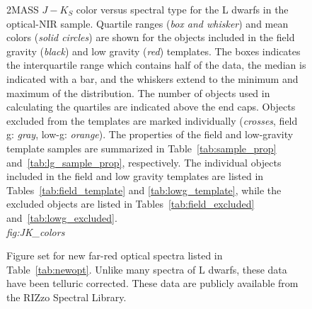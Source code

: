 \documentclass[12pt,preprint]{aastex}
\begin{document}
\begin{figure}
		\caption{2MASS $J-K_S$ color versus spectral type for the L dwarfs in the optical-NIR sample. 
		Quartile ranges (\emph{box and whisker}) and mean colors (\emph{solid circles}) are shown for the objects included in the field gravity (\emph{black}) and low gravity (\emph{red}) templates. The boxes indicates the interquartile range which contains half of the data, the median is indicated with a bar, and the whiskers extend to the minimum and maximum of the distribution. The number of objects used in calculating the quartiles are indicated above the end caps.
		Objects excluded from the templates are marked individually (\emph{crosses}, field g: \emph{gray}, low-g: \emph{orange}).
		The properties of the field and low-gravity template samples are summarized in Table~\ref{tab:sample_prop} and~\ref{tab:lg_sample_prop}, respectively. The individual objects included in the field and low gravity templates are listed in Tables~\ref{tab:field_template} and \ref{tab:lowg_template}, while the excluded objects are listed in Tables~\ref{tab:field_excluded} and~\ref{tab:lowg_excluded}.\\
		\emph{fig:JK\_colors} }
	\label{fig:JK_colors}
\end{figure}

\begin{figure}
		\caption{Figure set for new far-red optical spectra listed in Table~\ref{tab:newopt}. Unlike many spectra of L dwarfs, these data have been telluric corrected. These data are publicly available from the RIZzo Spectral Library.}
	\label{fig:newopt}
\end{figure}
\end{document}
